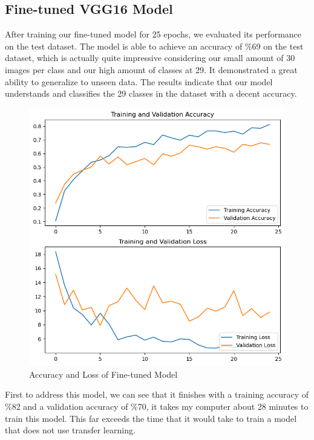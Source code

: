 \documentclass[12pt]{article}
\begin{document}
\subsection{Fine-tuned VGG16 Model}
After training our fine-tuned model for 25 epochs, we evaluated its performance on the test dataset.
The model is able to achieve an accuracy of \%69 on the test dataset, which is actually quite impressive considering our small amount of 30
images per class and our high amount of classes at 29. It demonstrated a great ability to generalize to unseen data.
The results indicate that our model understands and classifies the 29 classes in the dataset with a decent accuracy.\\
\begin{figure}[H]
    \centering
    \includegraphics*[scale=0.5]{images/loss+acc.png}\\
    Accuracy and Loss of Fine-tuned Model
\end{figure}
First to address this model, we can see that it finishes with a training accuracy of \%82 and a validation accuracy of \%70, it takes my computer about 28 minutes to train
this model. This far exceeds the time that it would take to train a model that does not use transfer learning. \\
\end{document}

